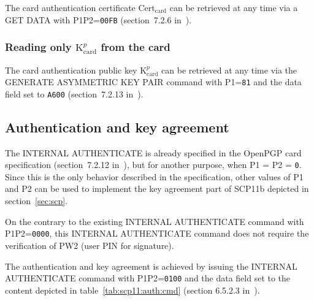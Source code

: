 \documentclass[dvipdfmx,11pt,a4paper,english,final]{article}
\newcommand{\cardkp}[0]{\ensuremath{\mathrm{K}_\mathrm{card}^p}\xspace}
\newcommand{\cardcert}[0]{\ensuremath{\mathrm{Cert}_\mathrm{card}}\xspace}
\newcommand{\code}[1]{\texttt{#1}\xspace}
\begin{document}

The card authentication certificate \cardcert can be retrieved at any
time via a GET DATA with P1P2=\code{00FB} (section~7.2.6
in~\cite{openpgp-card}).


\subsubsection{Reading only \cardkp from the card}
\label{sec:read:cardkp}

The card authentication public key \cardkp can be retrieved at any
time via the GENERATE ASYMMETRIC KEY PAIR command with P1=\code{81} and the
data field set to \code{A600} (section~7.2.13 in~\cite{openpgp-card}).

\subsection{Authentication and key agreement}
\label{sec:authentication}

The INTERNAL AUTHENTICATE is already specified in the OpenPGP card
specification (section~7.2.12 in~\cite{openpgp-card}), but for another
purpose, when P1 = P2 = \code{0}. Since this is the only behavior
described in the specification, other values of P1 and P2 can be used
to implement the key agreement part of SCP11b depicted in section~\ref{sec:scp}.

On the contrary to the existing INTERNAL AUTHENTICATE command with
P1P2=\code{0000}, this INTERNAL AUTHENTICATE command does not require the
verification of PW2 (user PIN for signature).

The authentication and key agreement is achieved by issuing the
INTERNAL AUTHENTICATE command with P1P2=\code{0100} and the data field
set to the content depicted in table~\ref{tab:scp11:auth:cmd} (section
6.5.2.3 in~\cite{gp-scp11}).
\end{document}
